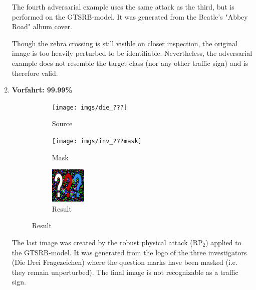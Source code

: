 \begin{enumerate}
The fourth adversarial example uses the same attack as the third, but is performed on the GTSRB-model.
It was generated from the Beatle's "Abbey Road" album cover.

Though the zebra crossing is still visible on closer inspection, the original image is too heavily perturbed to be identifiable. 
Nevertheless, the adversarial example does not resemble the target class (nor any other traffic sign) and is therefore valid.

\item
\textbf{Vorfahrt: 99.99\%}

\begin{figure}[!h]
\begin{subfigure}{.19\linewidth}
  \centering
  \texttt{[image: imgs/die\_???]}
  \caption{Source}
\end{subfigure}
\hspace{0.05\linewidth}
\begin{subfigure}{.19\linewidth}
  \centering
  \texttt{[image: imgs/inv\_???mask]}
  \caption{Mask}
\end{subfigure}
\hspace{0.05\linewidth}
\begin{subfigure}{.19\linewidth}
  \centering
  \includegraphics[width=0.7\linewidth]{imgs/20}
  \caption{Result}
\end{subfigure}
\end{figure}

The last image was created by the robust physical attack (RP$_2$) applied to the GTSRB-model.
It was generated from the logo of the three investigators (Die Drei Fragezeichen) where the question marks have been masked (i.e. they remain unperturbed).
The final image is not recognizable as a traffic sign.

\end{enumerate}

